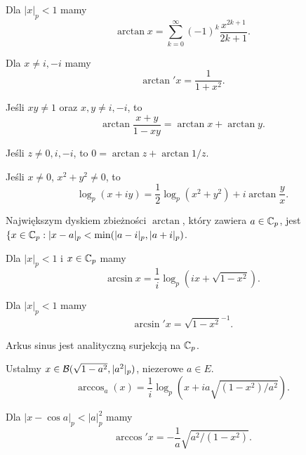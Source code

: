 \begin{fakt}
	Dla $|x|_p < 1$ mamy
	\[
		\arctan x = \sum_{k=0}^\infty (-1)^k \frac{x^{2k+1}}{2k+1}.
	\]
\end{fakt}

\begin{fakt}
	Dla $x \neq i, -i$ mamy
	\[
		\arctan' x = \frac 1{1 + x^2}.
	\]
\end{fakt}

\begin{fakt}
	Jeśli $xy \neq 1$ oraz $x,y \neq i, -i$, to
	\[
		\arctan \frac{x + y}{1 - xy} = \arctan x + \arctan y.
	\]
\end{fakt}

\begin{fakt}
	Jeśli $z \neq 0, i, -i$, to $0 = \arctan z + \arctan 1/z$.
\end{fakt}

\begin{fakt}
	Jeśli $x \neq 0$, $x^2  + y^2 \neq 0$, to
	\[
		\log_p (x +  iy) = \frac 12 \log_p (x^2 + y^2) + i \arctan \frac y x.
	\]
\end{fakt}

\begin{fakt}
	Największym dyskiem zbieżności $\arctan$, który zawiera $a \in \mathbb C_p$, jest $\{x \in \mathbb C_p : |x - a|_p < \min (|a - i|_p, |a+i|_p)$.
\end{fakt}

\begin{definicja}
	Dla $|x|_p < 1$ i $x \in \mathbb C_p$ mamy 
	\[
		\arcsin x = \frac 1i \log_p (ix + \sqrt{1 - x^2}).
	\]
\end{definicja}

\begin{fakt}
	Dla $|x|_p < 1$ mamy
	\[
		\arcsin' x = \sqrt{1 - x^2}^{-1}.
	\]
\end{fakt}

\begin{fakt}
	Arkus sinus jest analityczną surjekcją na $\mathbb C_p$.
\end{fakt}

\begin{definicja}
	Ustalmy $x \in \mathcal B(\sqrt{1 - a^2}, |a^2|_p)$, niezerowe $a \in E$.
	\[
		\arccos_a(x) = \frac 1i \log_p (x + ia \sqrt{(1-x^2) / a^2}).
	\]
\end{definicja}

\begin{fakt}
	Dla $|x - \cos a|_p < |a|_p^2$ mamy
	\[
		\arccos' x = - \frac 1 a \sqrt{a^2 / (1-x^2)}.
	\]
\end{fakt}